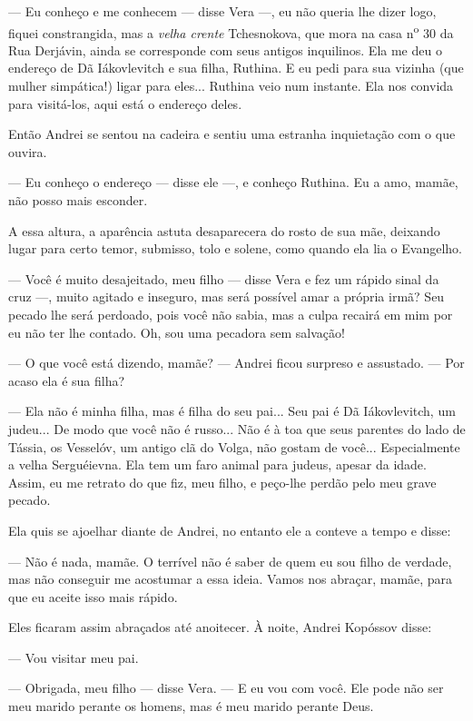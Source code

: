 --- Eu conheço e me conhecem --- disse Vera ---, eu não queria lhe dizer
logo, fiquei constrangida, mas a \emph{velha crente} Tchesnokova, que
mora na casa n\textsuperscript{o} 30 da Rua Derjávin, ainda se
corresponde com seus antigos inquilinos. Ela me deu o endereço de Dã
Iákovlevitch e sua filha, Ruthina. E eu pedi para sua vizinha (que
mulher simpática!) ligar para eles... Ruthina veio num instante. Ela nos
convida para visitá-los, aqui está o endereço deles.

Então Andrei se sentou na cadeira e sentiu uma estranha inquietação com
o que ouvira.

--- Eu conheço o endereço --- disse ele ---, e conheço Ruthina. Eu a
amo, mamãe, não posso mais esconder.

A essa altura, a aparência astuta desaparecera do rosto de sua mãe,
deixando lugar para certo temor, submisso, tolo e solene, como quando
ela lia o Evangelho.

--- Você é muito desajeitado, meu filho --- disse Vera e fez um rápido
sinal da cruz ---, muito agitado e inseguro, mas será possível amar a
própria irmã? Seu pecado lhe será perdoado, pois você não sabia, mas a
culpa recairá em mim por eu não ter lhe contado. Oh, sou uma pecadora
sem salvação!

--- O que você está dizendo, mamãe? --- Andrei ficou surpreso e
assustado. --- Por acaso ela é sua filha?

--- Ela não é minha filha, mas é filha do seu pai... Seu pai é Dã
Iákovlevitch, um judeu... De modo que você não é russo... Não é à toa
que seus parentes do lado de Tássia, os Vesselóv, um antigo clã do
Volga, não gostam de você... Especialmente a velha Serguéievna. Ela tem
um faro animal para judeus, apesar da idade. Assim, eu me retrato do que
fiz, meu filho, e peço-lhe perdão pelo meu grave pecado.

Ela quis se ajoelhar diante de Andrei, no entanto ele a conteve a tempo
e disse:

--- Não é nada, mamãe. O terrível não é saber de quem eu sou filho de
verdade, mas não conseguir me acostumar a essa ideia. Vamos nos abraçar,
mamãe, para que eu aceite isso mais rápido.

Eles ficaram assim abraçados até anoitecer. À noite, Andrei Kopóssov
disse:

--- Vou visitar meu pai.

--- Obrigada, meu filho --- disse Vera. --- E eu vou com você. Ele pode
não ser meu marido perante os homens, mas é meu marido perante Deus.


